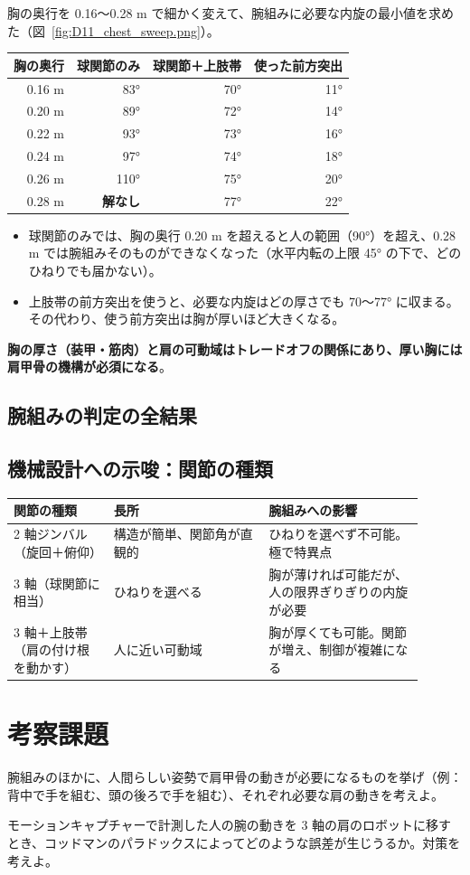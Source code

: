 胸の奥行を 0.16〜0.28 m で細かく変えて、腕組みに必要な内旋の最小値を求めた（図~\ref{fig:D11_chest_sweep.png}）。
\begin{longtable}{rrrr}
\toprule
胸の奥行 & 球関節のみ & 球関節＋上肢帯 & 使った前方突出 \\ \midrule \endhead
0.16 m & 83° & 70° & 11° \\
0.20 m & 89° & 72° & 14° \\
0.22 m & 93° & 73° & 16° \\
0.24 m & 97° & 74° & 18° \\
0.26 m & 110° & 75° & 20° \\
0.28 m & \textbf{解なし} & 77° & 22° \\
\bottomrule
\end{longtable}
\begin{itemize}
\item 球関節のみでは、胸の奥行 0.20 m を超えると人の範囲（90°）を超え、0.28 m では腕組みそのものができなくなった（水平内転の上限 45° の下で、どのひねりでも届かない）。
\item 上肢帯の前方突出を使うと、必要な内旋はどの厚さでも 70〜77° に収まる。その代わり、使う前方突出は胸が厚いほど大きくなる。
\end{itemize}
\textbf{胸の厚さ（装甲・筋肉）と肩の可動域はトレードオフの関係にあり、厚い胸には肩甲骨の機構が必須になる}。


\subsection{腕組みの判定の全結果}


\subsection{機械設計への示唆：関節の種類}

\begin{longtable}{p{0.22\linewidth}p{0.34\linewidth}p{0.34\linewidth}}
\toprule
関節の種類 & 長所 & 腕組みへの影響 \\ \midrule \endhead
2 軸ジンバル（旋回＋俯仰） & 構造が簡単、関節角が直観的 & ひねりを選べず不可能。極で特異点 \\
3 軸（球関節に相当） & ひねりを選べる & 胸が薄ければ可能だが、人の限界ぎりぎりの内旋が必要 \\
3 軸＋上肢帯（肩の付け根を動かす） & 人に近い可動域 & 胸が厚くても可能。関節が増え、制御が複雑になる \\
\bottomrule
\end{longtable}

\section*{考察課題}
\begin{exercise}
腕組みのほかに、人間らしい姿勢で肩甲骨の動きが必要になるものを挙げ（例：背中で手を組む、頭の後ろで手を組む）、それぞれ必要な肩の動きを考えよ。
\end{exercise}
\begin{exercise}
モーションキャプチャーで計測した人の腕の動きを 3 軸の肩のロボットに移すとき、コッドマンのパラドックスによってどのような誤差が生じうるか。対策を考えよ。
\end{exercise}
